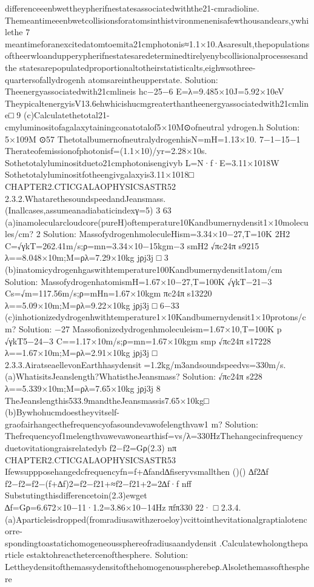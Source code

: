 differenceeenbwettheypherifnestatesassociatedwiththe21-cmradioline.
Themeantimeeenbwetcollisionsforatomsinthistvironmenenisafewthousandears,ywhilethe
7
meantimeforanexcitedatomtoemita21cmphotonis≈1.1×10.Asaresult,thepopulations
oftheerwloandupperypherifnestatesaredeterminedtirelyenybcollisionalprocessesandthe
statesarepopulatedproportionaltotheirstatisticalts,eighwsothree-quartersofallydrogenh
atomsareintheupperstate.
Solution:
Theenergyassociatedwith21cmlineis
hc−25−6
E=λ=9.485×10J=5.92×10eV
TheypicaltenergyisV13.6ehwhicishucmgreaterthantheenergyassociatedwith21cmline□
9
(c)Calculatethetotal21-cmyluminositofagalaxytainingconatotalof5×10M⊙ofneutral
ydrogen.h
Solution:
5×109M
⊙57
ThetotalbumernofneutralydrogenhisN=mH=1.13×10.
7−1−15−1
Therateofemissionofphotonisf=(1.1×10)/yr=2.28×10s.
Sothetotalyluminositdueto21cmphotonisengivyb
L=N·f·E=3.11×1018W
Sothetotalyluminositfotheengivgalaxyis3.11×1018□
CHAPTER2.CTICGALAOPHYSICSASTR52
2.3.2.WhatarethesoundspeedandJeansmass.(Inallcases,assumeanadiabaticindexγ=5)
3
63
(a)inamolecularcloudcore(pureH)oftemperature10Kandbumernydensit1×10molecules/cm?
2
Solution:
MassofydrogenhmoleculeHism=3.34×10−27,T=10K
2H2
C=√γkT=262.41m/s;ρ=mn=3.34×10−15kgm−3
smH2
√πc24π
s9215
λ==8.048×10m;M=ρλ=7.29×10kg
jρj3j
□
3
(b)inatomicydrogenhgaswithtemperature100Kandbumernydensit1atom/cm
Solution:
MassofydrogenhatomismH=1.67×10−27,T=100K
√γkT−21−3
Cs=√m=117.56m/s;ρ=mHn=1.67×10kgm
πc24π
s13220
λ==5.09×10m;M=ρλ=9.22×10kg
jρj3j
□
6−33
(c)inhotionizedydrogenhwithtemperature1×10Kandbumernydensit1×10protons/cm?
Solution:
−27
Massofionizedydrogenhmoleculeism=1.67×10,T=100K
p
√γkT5−24−3
C==1.17×10m/s;ρ=mn=1.67×10kgm
smp
√πc24π
s17228
λ==1.67×10m;M=ρλ=2.91×10kg
jρj3j
□
2.3.3.AiratseaellevonEarthhasydensit￿=1.2kg/m3andsoundspeedvs=330m/s.
(a)WhatisitsJeanslength?WhatistheJeansmass?
Solution:
√πc24π
s228
λ==5.339×10m;M=ρλ=7.65×10kg
jρj3j
8
TheJeanslengthis533.9mandtheJeansmassis7.65×10kg□
(b)Bywhohucmdoestheyvitself-graofairhangecthefrequencyofasoundevawofelengthvaw1
m?
Solution:
Thefrequencyof1melengthvawevawonearthisf=vs/λ=330HzThehangecinfrequency
duetovitationgraisrelatedyb
f2−f2=Gρ(2.3)
nπ
CHAPTER2.CTICGALAOPHYSICSASTR53
Ifewsuppposehangedcfrequencyfn=f+∆fand∆fiseryvsmallthen
()()
∆f2∆f
f2−f2=f2−(f+∆f)2=f2−f21+≈f2−f21+2=2∆f·f
nff
Substutingthisdifferencetoin(2.3)ewget
∆f=Gρ=6.672×10−11·1.2=3.86×10−14Hz
πfπ330
22·
□
2.3.4.(a)Aparticleisdropped(fromradiusawithzeroeloy)vcittointhevitationalgraptialotencorre-
spondingtoastatichomogeneoussphereofradiusaandydensit￿.Calculatewholongtheparticle
estaktohreacthetercenofthesphere.
Solution:
Lettheydensitofthemassydensitofthehomogenousspherebeρ.Alsolethemassofthesphere
